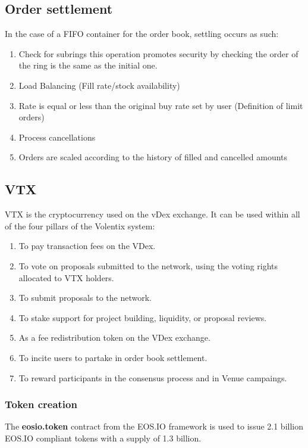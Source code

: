 \documentclass[]{article}
\begin{document}
{\subsection{Order settlement}
In the case of a FIFO container for the order book,
settling occurs as such:
\begin{enumerate}
	\item Check for subrings
	this operation promotes security by checking the order of the ring is the same as the initial one.
	\item Load Balancing (Fill rate/stock availability)
	\item Rate is equal or less than the original buy rate set by user (Definition of limit orders)
	\item Process cancellations\\
	\item Orders are scaled according to the history of filled and cancelled amounts\\	 
\end{enumerate}	
	

\subsection{VTX}
VTX is the cryptocurrency used on the vDex exchange. 
It can be used within all of the four pillars of the Volentix system:
\begin{enumerate}
\item To pay transaction fees on the VDex.
\item To vote on proposals submitted to the network, using the voting rights allocated to VTX holders.
\item To submit proposals to the network.
\item To stake support for project building, liquidity, or proposal reviews. 
\item As a fee redistribution token on the VDex exchange.
\item To incite users to partake in order book settlement.
\item To reward participants in the consensus process and in Venue campaings.
\end{enumerate}



\subsubsection{Token creation}
The \textbf{eosio.token} contract from the EOS.IO framework is used to issue 2.1 billion EOS.IO compliant tokens 
with a supply of 1.3 billion.
 
}
\end{document}
